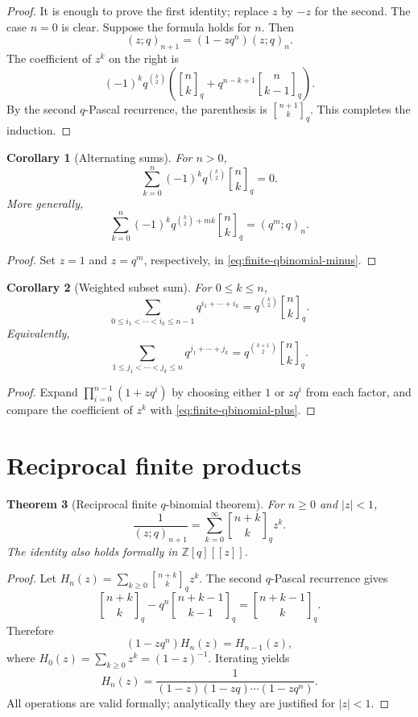 \documentclass[11pt,oneside,openany]{book}
\newtheorem{theorem}{Theorem}[chapter]
\newtheorem{corollary}[theorem]{Corollary}
\theoremstyle{definition}
\theoremstyle{remark}
\newcommand{\qbinom}[2]{\genfrac{[}{]}{0pt}{}{#1}{#2}_{q}}
\newcommand{\Z}{\mathbb Z}
\newcommand{\abs}[1]{\lvert #1\rvert}
\begin{document}
\begin{proof}
It is enough to prove the first identity; replace $z$ by $-z$ for the second.  The case $n=0$ is clear.  Suppose the formula holds for $n$.  Then
\[
 (z;q)_{n+1}=(1-zq^n)(z;q)_n.
\]
The coefficient of $z^k$ on the right is
\[
 (-1)^kq^{\binom k2}
 \left(\qbinom nk+q^{n-k+1}\qbinom n{k-1}\right).
\]
By the second $q$-Pascal recurrence, the parenthesis is $\qbinom{n+1}k$.  This completes the induction.
\end{proof}

\begin{corollary}[Alternating sums]\label{cor:alternating-qbinom}
For $n>0$,
\[
 \sum_{k=0}^{n}(-1)^kq^{\binom k2}\qbinom nk=0.
\]
More generally,
\[
 \sum_{k=0}^{n}(-1)^kq^{\binom k2+mk}\qbinom nk=(q^m;q)_n.
\]
\end{corollary}

\begin{proof}
Set $z=1$ and $z=q^m$, respectively, in \eqref{eq:finite-qbinomial-minus}.
\end{proof}

\begin{corollary}[Weighted subset sum]\label{cor:weighted-subsets}
For $0\le k\le n$,
\[
 \sum_{0\le i_1<\cdots<i_k\le n-1}q^{i_1+\cdots+i_k}
 =q^{\binom k2}\qbinom nk.
\]
Equivalently,
\[
 \sum_{1\le j_1<\cdots<j_k\le n}q^{j_1+\cdots+j_k}
 =q^{\binom{k+1}{2}}\qbinom nk.
\]
\end{corollary}

\begin{proof}
Expand $\prod_{i=0}^{n-1}(1+zq^i)$ by choosing either $1$ or $zq^i$ from each factor, and compare the coefficient of $z^k$ with \eqref{eq:finite-qbinomial-plus}.
\end{proof}

\section{Reciprocal finite products}

\begin{theorem}[Reciprocal finite $q$-binomial theorem]\label{thm:reciprocal-finite}
For $n\ge0$ and $\abs z<1$,
\[
 \frac{1}{(z;q)_{n+1}}
 =\sum_{k=0}^{\infty}\qbinom{n+k}{k}z^k.
\]
The identity also holds formally in $\Z[q][[z]]$.
\end{theorem}

\begin{proof}
Let
\(
 H_n(z)=\sum_{k\ge0}\qbinom{n+k}{k}z^k.
\)
The second $q$-Pascal recurrence gives
\[
 \qbinom{n+k}{k}-q^n\qbinom{n+k-1}{k-1}
 =\qbinom{n+k-1}{k}.
\]
Therefore
\[
 (1-zq^n)H_n(z)=H_{n-1}(z),
\]
where $H_0(z)=\sum_{k\ge0}z^k=(1-z)^{-1}$.  Iterating yields
\[
 H_n(z)=\frac1{(1-z)(1-zq)\cdots(1-zq^n)}.
\]
All operations are valid formally; analytically they are justified for $\abs z<1$.
\end{proof}
\end{document}
